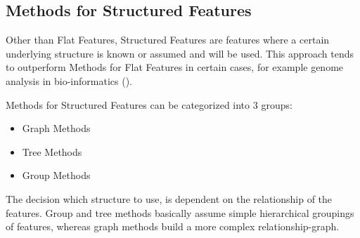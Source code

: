 \subsection{Methods for Structured Features}
\label{sec:methods.structured}


Other than Flat Features, Structured Features are features where a certain
underlying structure is known or assumed and will be used. This approach tends
to outperform Methods for Flat Features in certain cases, for example
genome analysis in bio-informatics (\cite{Tang:14}).

Methods for Structured Features can be categorized into $3$ groups:

\begin{itemize}
  \item Graph Methods
  \item Tree Methods
  \item Group Methods
\end{itemize}

The decision which structure to use, is dependent on the relationship of the
features. Group and tree methods basically assume simple hierarchical groupings
of features, whereas graph methods build a more complex relationship-graph.




